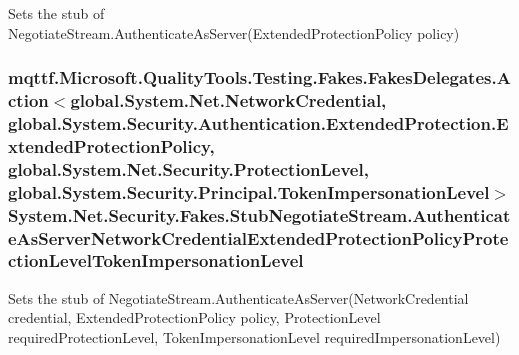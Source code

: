 Sets the stub of Negotiate\-Stream.\-Authenticate\-As\-Server(\-Extended\-Protection\-Policy policy)

\hypertarget{class_system_1_1_net_1_1_security_1_1_fakes_1_1_stub_negotiate_stream_af29c520aa8a303f3a676911812932bcd}{
\subsubsection[{Authenticate\-As\-Server\-Network\-Credential\-Extended\-Protection\-Policy\-Protection\-Level\-Token\-Impersonation\-Level}]{\setlength{\rightskip}{0pt plus 5cm}mqttf.\-Microsoft.\-Quality\-Tools.\-Testing.\-Fakes.\-Fakes\-Delegates.\-Action$<$global.\-System.\-Net.\-Network\-Credential, global.\-System.\-Security.\-Authentication.\-Extended\-Protection.\-Extended\-Protection\-Policy, global.\-System.\-Net.\-Security.\-Protection\-Level, global.\-System.\-Security.\-Principal.\-Token\-Impersonation\-Level$>$ System.\-Net.\-Security.\-Fakes.\-Stub\-Negotiate\-Stream.\-Authenticate\-As\-Server\-Network\-Credential\-Extended\-Protection\-Policy\-Protection\-Level\-Token\-Impersonation\-Level}}\label{class_system_1_1_net_1_1_security_1_1_fakes_1_1_stub_negotiate_stream_af29c520aa8a303f3a676911812932bcd}


Sets the stub of Negotiate\-Stream.\-Authenticate\-As\-Server(\-Network\-Credential credential, Extended\-Protection\-Policy policy, Protection\-Level required\-Protection\-Level, Token\-Impersonation\-Level required\-Impersonation\-Level)

